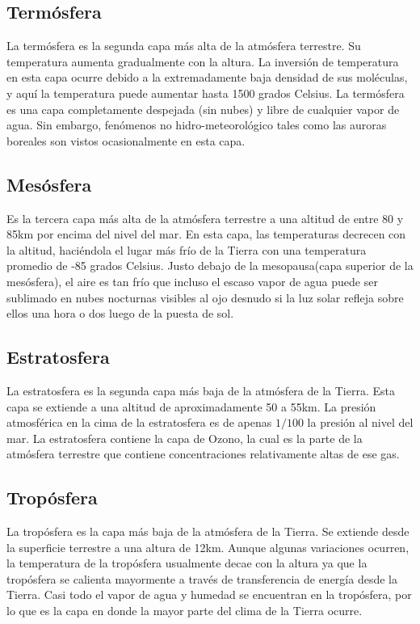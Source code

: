 \documentclass{article}
\begin{document}
\subsection{Termósfera}
La termósfera es la segunda capa más alta de la atmósfera terrestre. Su temperatura aumenta gradualmente con la altura. La inversión de temperatura en esta capa ocurre debido a la extremadamente baja densidad de sus moléculas, y aquí la temperatura puede aumentar hasta 1500 grados Celsius.
La termósfera es una capa completamente despejada (sin nubes) y libre de cualquier vapor de agua. Sin embargo, fenómenos no hidro-meteorológico tales como las auroras boreales son vistos ocasionalmente en esta capa. 
\subsection{Mesósfera}
Es la tercera capa más alta de la atmósfera terrestre a una altitud de entre 80 y 85km por encima del nivel del mar. 
En esta capa, las temperaturas decrecen con la altitud, haciéndola el lugar más frío de la Tierra con una temperatura promedio de -85 grados Celsius. Justo debajo de la mesopausa(capa superior de la mesósfera), el aire es tan frío que incluso el escaso vapor de agua puede ser sublimado en nubes nocturnas visibles al ojo desnudo si la luz solar refleja sobre ellos una hora o dos luego de la puesta de sol. 
\subsection{Estratosfera}
La estratosfera es la segunda capa más baja de la atmósfera de la Tierra. Esta capa se extiende a una altitud de aproximadamente 50 a 55km.
La presión atmosférica en la cima de la estratosfera es de apenas $1/100$ la presión al nivel del mar. La estratosfera contiene la capa de Ozono, la cual es la parte de la atmósfera terrestre que contiene concentraciones relativamente altas de ese gas. 
\subsection{Tropósfera}
La tropósfera es la capa más baja de la atmósfera de la Tierra. Se extiende desde la superficie terrestre a una altura de 12km.
Aunque algunas variaciones ocurren, la temperatura de la tropósfera usualmente decae con la altura ya que la tropósfera se calienta mayormente a través de transferencia de energía desde la Tierra.
Casi todo el vapor de agua y humedad se encuentran en la tropósfera, por lo que es la capa en donde la mayor parte del clima de la Tierra ocurre.
\end{document}

